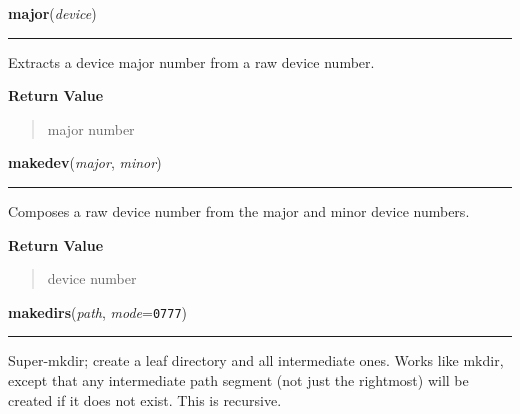 \hspace{.8\funcindent}\begin{boxedminipage}{\funcwidth}

    \raggedright \textbf{major}(\textit{device})

    \vspace{-1.5ex}

    \rule{\textwidth}{0.5\fboxrule}
\setlength{\parskip}{2ex}
    Extracts a device major number from a raw device number.

\setlength{\parskip}{1ex}
      \textbf{Return Value}
    \vspace{-1ex}

      \begin{quote}
      major number

      \end{quote}

    \end{boxedminipage}

    \label{os:makedev}

    \vspace{0.5ex}

\hspace{.8\funcindent}\begin{boxedminipage}{\funcwidth}

    \raggedright \textbf{makedev}(\textit{major}, \textit{minor})

    \vspace{-1.5ex}

    \rule{\textwidth}{0.5\fboxrule}
\setlength{\parskip}{2ex}
    Composes a raw device number from the major and minor device numbers.

\setlength{\parskip}{1ex}
      \textbf{Return Value}
    \vspace{-1ex}

      \begin{quote}
      device number

      \end{quote}

    \end{boxedminipage}

    \label{os:makedirs}

    \vspace{0.5ex}

\hspace{.8\funcindent}\begin{boxedminipage}{\funcwidth}

    \raggedright \textbf{makedirs}(\textit{path}, \textit{mode}={\tt 0777})

    \vspace{-1.5ex}

    \rule{\textwidth}{0.5\fboxrule}
\setlength{\parskip}{2ex}
    Super-mkdir; create a leaf directory and all intermediate ones. Works 
    like mkdir, except that any intermediate path segment (not just the 
    rightmost) will be created if it does not exist.  This is recursive.

\setlength{\parskip}{1ex}
    \end{boxedminipage}

